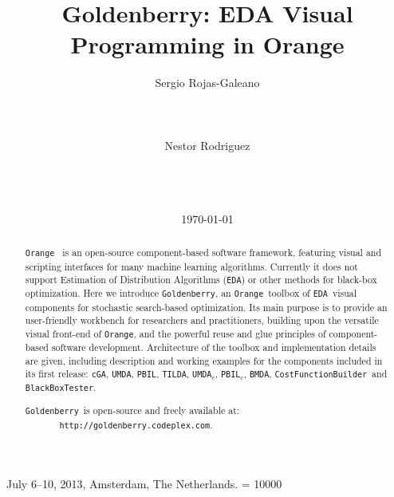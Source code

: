 \documentclass{sig-alternate}
\newcommand{\Orange}{\texttt{Orange}}
\newcommand{\GB}{\texttt{Goldenberry}}
\newcommand{\PBIL}{\texttt{PBIL}}
\newcommand{\UMDA}{\texttt{UMDA}}
\newcommand{\BMDA}{\texttt{BMDA}}
\newcommand{\PBILc}{\texttt{PBIL$_c$}}
\newcommand{\UMDAc}{\texttt{UMDA$_c$}}
\newcommand{\cGA}{\texttt{cGA}}
\newcommand{\EDA}{\texttt{EDA}}
\newcommand{\TILDA}{\texttt{TILDA}}
\newcommand{\CostFunction}{\texttt{CostFunctionBuilder}}
\newcommand{\BBTester}{\texttt{BlackBoxTester}}
\begin{document}
		 {July 6--10, 2013, Amsterdam, The Netherlands.}
		\widowpenalty = 10000
\title{Goldenberry: EDA Visual Programming in Orange}
%
\author{
\alignauthor
Sergio Rojas-Galeano\\
       \\
       \\
       \\
\alignauthor
Nestor Rodriguez\\
       \\
       \\
       \\
}
\date{\today}
\maketitle

\begin{abstract}
\Orange~ is an open-source component-based software framework, featuring visual and scripting interfaces for many machine learning algorithms. Currently it does not support Estimation of Distribution Algorithms (\EDA) or other methods for black-box optimization. Here we introduce \GB, an \Orange~toolbox of \EDA~visual components for stochastic search-based optimization. Its main purpose is to provide an user-friendly workbench for researchers and practitioners, building upon the versatile visual front-end of \Orange, and the powerful reuse and glue principles of component-based software development. Architecture of the toolbox and implementation details are given, including description and working examples for the components included in its first release: \cGA, \UMDA, \PBIL, \TILDA, \UMDAc, \PBILc, \BMDA, \CostFunction~and \BBTester. 

\GB~is open-source and freely available at: \\\texttt{\mbox{~~~~~~~}http://goldenberry.codeplex.com}.
\end{abstract}
\end{document}
